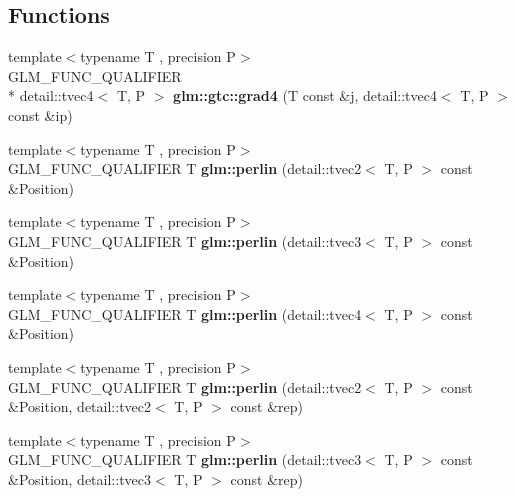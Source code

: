 \subsection*{Functions}
\begin{DoxyCompactItemize}
\item 
\hypertarget{namespaceglm_1_1gtc_a60a628dac031a1bafeead87b20b1b641}{{\footnotesize template$<$typename T , precision P$>$ }\\G\-L\-M\-\_\-\-F\-U\-N\-C\-\_\-\-Q\-U\-A\-L\-I\-F\-I\-E\-R \\*
detail\-::tvec4$<$ T, P $>$ {\bfseries glm\-::gtc\-::grad4} (T const \&j, detail\-::tvec4$<$ T, P $>$ const \&ip)}\label{namespaceglm_1_1gtc_a60a628dac031a1bafeead87b20b1b641}

\item 
\hypertarget{namespaceglm_aaf4944b3c2a00c1e7a1b25b96cea6bfb}{{\footnotesize template$<$typename T , precision P$>$ }\\G\-L\-M\-\_\-\-F\-U\-N\-C\-\_\-\-Q\-U\-A\-L\-I\-F\-I\-E\-R T {\bfseries glm\-::perlin} (detail\-::tvec2$<$ T, P $>$ const \&Position)}\label{namespaceglm_aaf4944b3c2a00c1e7a1b25b96cea6bfb}

\item 
\hypertarget{namespaceglm_a11707c4e77f153abec905731b1ce52a0}{{\footnotesize template$<$typename T , precision P$>$ }\\G\-L\-M\-\_\-\-F\-U\-N\-C\-\_\-\-Q\-U\-A\-L\-I\-F\-I\-E\-R T {\bfseries glm\-::perlin} (detail\-::tvec3$<$ T, P $>$ const \&Position)}\label{namespaceglm_a11707c4e77f153abec905731b1ce52a0}

\item 
\hypertarget{namespaceglm_ac5aa8a72ead80436e891284db02a2f20}{{\footnotesize template$<$typename T , precision P$>$ }\\G\-L\-M\-\_\-\-F\-U\-N\-C\-\_\-\-Q\-U\-A\-L\-I\-F\-I\-E\-R T {\bfseries glm\-::perlin} (detail\-::tvec4$<$ T, P $>$ const \&Position)}\label{namespaceglm_ac5aa8a72ead80436e891284db02a2f20}

\item 
\hypertarget{namespaceglm_aa7529608f67b6200929a30cc5e3f5c71}{{\footnotesize template$<$typename T , precision P$>$ }\\G\-L\-M\-\_\-\-F\-U\-N\-C\-\_\-\-Q\-U\-A\-L\-I\-F\-I\-E\-R T {\bfseries glm\-::perlin} (detail\-::tvec2$<$ T, P $>$ const \&Position, detail\-::tvec2$<$ T, P $>$ const \&rep)}\label{namespaceglm_aa7529608f67b6200929a30cc5e3f5c71}

\item 
\hypertarget{namespaceglm_adc2ed67b3bf55ef9fcf95dae1b980148}{{\footnotesize template$<$typename T , precision P$>$ }\\G\-L\-M\-\_\-\-F\-U\-N\-C\-\_\-\-Q\-U\-A\-L\-I\-F\-I\-E\-R T {\bfseries glm\-::perlin} (detail\-::tvec3$<$ T, P $>$ const \&Position, detail\-::tvec3$<$ T, P $>$ const \&rep)}\label{namespaceglm_adc2ed67b3bf55ef9fcf95dae1b980148}


\end{DoxyCompactItemize}
